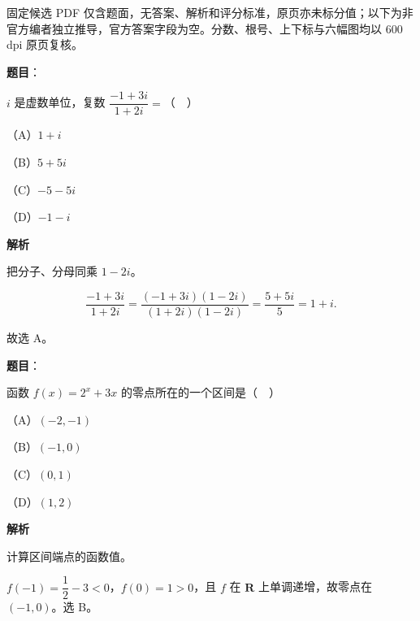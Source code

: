 

\begin{gktip}
固定候选 PDF 仅含题面，无答案、解析和评分标准，原页亦未标分值；以下为非官方编者独立推导，官方答案字段为空。分数、根号、上下标与六幅图均以 600 dpi 原页复核。
\end{gktip}

\begin{answer}

\textbf{题目}：

$i$ 是虚数单位，复数 $\dfrac{-1+3i}{1+2i}=$（　）

（A）$1+i$

（B）$5+5i$

（C）$-5-5i$

（D）$-1-i$

\textbf{解析}

把分子、分母同乘 $1-2i$。

\nopagebreak[4]
\[\frac{-1+3i}{1+2i}=\frac{(-1+3i)(1-2i)}{(1+2i)(1-2i)}
=\frac{5+5i}5=1+i.\]

故选 A。


\end{answer}
\begin{answer}

\textbf{题目}：

函数 $f(x)=2^x+3x$ 的零点所在的一个区间是（　）

（A）$(-2,-1)$

（B）$(-1,0)$

（C）$(0,1)$

（D）$(1,2)$

\textbf{解析}

计算区间端点的函数值。

$f(-1)=\dfrac12-3<0$，$f(0)=1>0$，且 $f$ 在 $\mathbf R$ 上单调递增，故零点在 $(-1,0)$。选 B。


\end{answer}
